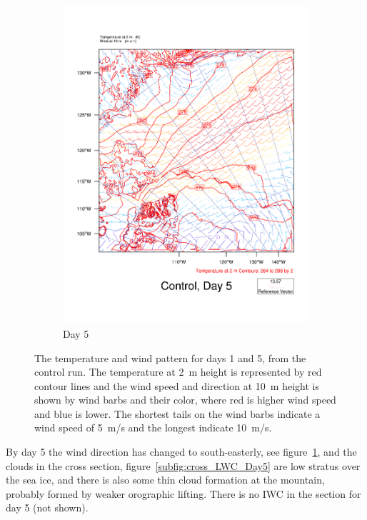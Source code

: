 \begin{figure}
\begin{subfigure}{0.48\textwidth}
        \includegraphics[width=\textwidth]{results/control/T2UV10_Control_Day5.pdf}
        \caption{Day 5}
        \label{subfig:weather_cont_day5}
    \end{subfigure}
    \caption{The temperature and wind pattern for days 1 and 5, from the control run. The temperature at 2~m height is represented by red contour lines and the wind speed and direction at 10~m height is shown by wind barbs and their color, where red is higher wind speed and blue is lower. The shortest tails on the wind barbs indicate a wind speed of 5~m/s and the longest indicate 10~m/s.}
    \label{fig:weather}
\end{figure}

By day 5 the wind direction has changed to south-easterly, see figure~\ref{subfig:weather_cont_day5}, and the clouds in the cross section, figure~\ref{subfig:cross_LWC_Day5} are low stratus over the sea ice, and there is also some thin cloud formation at the mountain, probably formed by weaker orographic lifting. There is no IWC in the section for day 5 (not shown).

